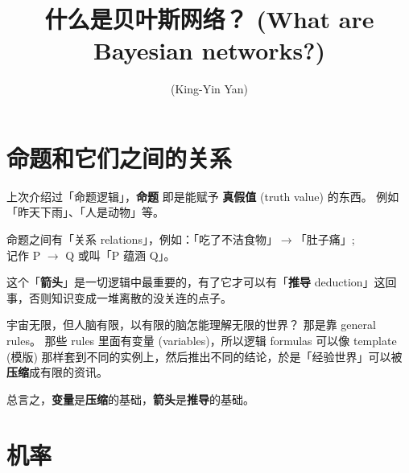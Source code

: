 \documentclass[orivec]{llncs}
\title{什么是贝叶斯网络？ (What are Bayesian networks?)}
\author{\usebox{\MyName} (King-Yin Yan)
}
\institute{General.Intelligence@Gmail.com}
\begin{document}
\maketitle
\setlength{\parindent}{0em}
\setlength{\parskip}{2.8ex}


\section{命题和它们之间的关系}

上次介绍过「命题逻辑」，\textbf{命题} 即是能赋予 \textbf{真假值} (truth value) 的东西。  例如「昨天下雨」、「人是动物」等。

命题之间有「关系 relations」，例如：「吃了不洁食物」$\rightarrow$「肚子痛」; \\
记作 P $\rightarrow$ Q 或叫「P 蕴涵 Q」。

这个「\textbf{箭头}」是一切逻辑中最重要的，有了它才可以有「\textbf{推导} deduction」这回事，否则知识变成一堆离散的没关连的点子。

宇宙无限，但人脑有限，以有限的脑怎能理解无限的世界？ 那是靠 general rules。  那些 rules 里面有变量 (variables)，所以逻辑 formulas 可以像 template (模版) 那样套到不同的实例上，然后推出不同的结论，於是「经验世界」可以被\textbf{压缩}成有限的资讯。

总言之，\textbf{变量}是\textbf{压缩}的基础，\textbf{箭头}是\textbf{推导}的基础。

\section{机率}
\end{document}
